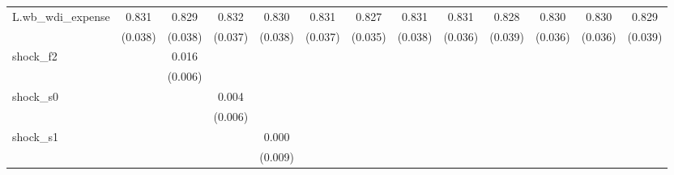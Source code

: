 {\begin{tabular}{l*{12}{c}}
\addlinespace
L.wb\_wdi\_expense&       0.831\sym{***}&       0.829\sym{***}&       0.832\sym{***}&       0.830\sym{***}&       0.831\sym{***}&       0.827\sym{***}&       0.831\sym{***}&       0.831\sym{***}&       0.828\sym{***}&       0.830\sym{***}&       0.830\sym{***}&       0.829\sym{***}\\
            &     (0.038)         &     (0.038)         &     (0.037)         &     (0.038)         &     (0.037)         &     (0.035)         &     (0.038)         &     (0.036)         &     (0.039)         &     (0.036)         &     (0.036)         &     (0.039)         \\
\addlinespace
shock\_f2    &                     &       0.016\sym{**} &                     &                     &                     &                     &                     &                     &                     &                     &                     &                     \\
            &                     &     (0.006)         &                     &                     &                     &                     &                     &                     &                     &                     &                     &                     \\
\addlinespace
shock\_s0    &                     &                     &       0.004         &                     &                     &                     &                     &                     &                     &                     &                     &                     \\
            &                     &                     &     (0.006)         &                     &                     &                     &                     &                     &                     &                     &                     &                     \\
\addlinespace
shock\_s1    &                     &                     &                     &       0.000         &                     &                     &                     &                     &                     &                     &                     &                     \\
            &                     &                     &                     &     (0.009)         &                     &                     &                     &                     &                     &                     &                     &                     \\

\end{tabular}}
